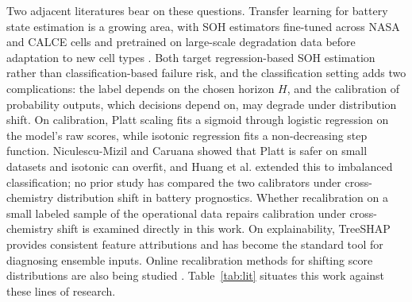 \documentclass[IJPHM, 2014, 00]{PHMSociety}
\begin{document}
Two adjacent literatures bear on these questions. Transfer learning for battery state estimation is a growing area, with SOH estimators fine-tuned across NASA and CALCE cells \cite{sahoo2022transfer} and pretrained on large-scale degradation data before adaptation to new cell types \cite{lu2023deep}. Both target regression-based SOH estimation rather than classification-based failure risk, and the classification setting adds two complications: the label depends on the chosen horizon $H$, and the calibration of probability outputs, which decisions depend on, may degrade under distribution shift. On calibration, Platt scaling \cite{platt1999probabilistic} fits a sigmoid through logistic regression on the model's raw scores, while isotonic regression \cite{zadrozny2002transforming} fits a non-decreasing step function. Niculescu-Mizil and Caruana \citeyear{niculescu2005predicting} showed that Platt is safer on small datasets and isotonic can overfit, and Huang et al. \citeyear{huang2020experimental} extended this to imbalanced classification; no prior study has compared the two calibrators under cross-chemistry distribution shift in battery prognostics. Whether recalibration on a small labeled sample of the operational data repairs calibration under cross-chemistry shift is examined directly in this work. On explainability, TreeSHAP \cite{lundberg2020from} provides consistent feature attributions and has become the standard tool for diagnosing ensemble inputs. Online recalibration methods for shifting score distributions are also being studied \cite{gupta2023online}. Table~\ref{tab:lit} situates this work against these lines of research.
\end{document}
